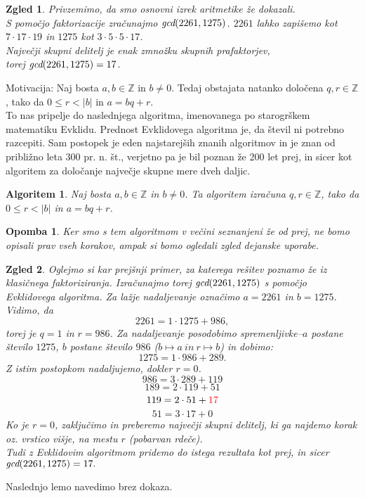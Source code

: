 \documentclass[a4paper,12pt]{article}
\newtheorem{opomba}{Opomba}
\newtheorem{zgled}{Zgled}
\newtheorem{algoritem}{Algoritem}
\begin{document}
\begin{zgled}
	Privzemimo, da smo osnovni izrek aritmetike že dokazali.
	\\
	S pomočjo faktorizacije zračunajmo $\emph{gcd}(2261, 1275)$. $2261$ lahko zapišemo kot
	$7\cdot17\cdot19$ in $1275$ kot $3\cdot5\cdot5\cdot17$.
	\\
	Največji skupni delitelj je enak zmnožku skupnih prafaktorjev, 
	\\
	torej $\emph{gcd}(2261, 1275) = 17$.
\end{zgled}
Motivacija: Naj bosta $a, b \in \mathbb{Z}$ in $b \ne 0$. Tedaj obstajata natanko določena
$q, r \in \mathbb{Z}$, tako da $0 \le r < |b|$ in $a = bq + r$. \\
To nas pripelje do naslednjega algoritma,
imenovanega po starogrškem matematiku Evklidu. Prednost Evklidovega
algoritma je, da števil ni potrebno razcepiti. Sam postopek je eden najstarejših
znanih algoritmov in je znan od približno leta 300 pr. n. št., verjetno pa je bil
poznan že 200 let prej, in sicer kot algoritem za določanje največje skupne mere
dveh daljic.

\begin{algoritem}
	Naj bosta $a, b \in \mathbb{Z}$ in $b \ne 0$. Ta algoritem izračuna
	$q, r \in \mathbb{Z}$, tako da $0 \le r < |b|$ in $a = bq + r$. 
\end{algoritem}

\begin{opomba}
	Ker smo s tem algoritmom v večini seznanjeni že od prej, ne bomo
	opisali prav vseh korakov, ampak si bomo ogledali zgled dejanske uporabe.
\end{opomba}

\begin{zgled}
	Oglejmo si kar prejšnji primer, za katerega rešitev poznamo že iz klasičnega
	faktoriziranja. Izračunajmo torej $\emph{gcd}(2261, 1275)$ s pomočjo Evklidovega
	algoritma. Za lažje nadaljevanje označimo $a = 2261$ in $b = 1275$.
	\\
	Vidimo, da
	$$2261 = 1\cdot1275 + 986,$$
	torej je $q = 1$ in $r = 986$. Za nadaljevanje posodobimo spremenljivke--$a$ postane
	število $1275$, $b$ postane število $986$ ($b \longmapsto a \ in \ r \longmapsto b$) in dobimo:
	$$1275 = 1\cdot 986 + 289.$$
	Z istim postopkom nadaljujemo, dokler $r = 0$.
	$$986 = 3\cdot 289 + 119$$
	$$189 = 2\cdot 119 + 51$$
	$$119 = 2\cdot 51 + \textcolor{red}{17}$$
	$$51 = 3\cdot 17 + 0$$
	Ko je $r = 0$, zaključimo in preberemo največji skupni delitelj, ki ga najdemo
	korak oz. vrstico višje, na mestu $r$ (pobarvan rdeče).
	\\
	Tudi z Evklidovim algoritmom pridemo do istega rezultata kot prej, in sicer
	$\emph{gcd}(2261, 1275) = 17.$
\end{zgled}
Naslednjo lemo navedimo brez dokaza.
\end{document}
